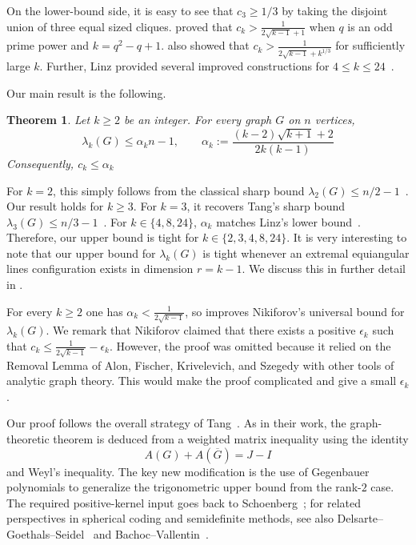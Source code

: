 \documentclass[12pt]{amsart}
\newtheorem{theorem}{Theorem}[section]
\theoremstyle{myremark}
\newcommand{\1}{\mathbf{1}}
\begin{document}
On the lower-bound side, it is easy to see that $c_3 \geq 1/3$ by taking the disjoint union of three equal sized cliques. \cite{Nikiforov15} proved that $c_k > \frac{1}{2\sqrt{k-1}+1}$ when $q$ is an odd prime power and $k = q^2 - q + 1$. \cite{Nikiforov15} also showed that $c_k > \frac{1}{2\sqrt{k-1}+k^{1/3}}$ for sufficiently large $k$. Further, Linz provided several improved constructions for $4 \leq k \leq 24$~\cite{Linz23}. 


Our main result is the following.

\begin{theorem}\label{thm:main-general}
Let $k\ge 2$ be an integer. For every graph $G$ on $n$ vertices,
\[
\lambda_k(G)\le \alpha_k n-1,
\qquad
\alpha_k:= \frac{(k-2)\sqrt{k+1}+2}{2k(k-1)}
\]
Consequently, $c_k \leq \alpha_k$
\end{theorem}

For $k=2$, this simply follows from the classical sharp bound $\lambda_2(G)\le n/2-1$~\cite{Hong88,Nikiforov15}. Our result holds for $k \geq 3$. For $k=3$, it recovers Tang's sharp bound $\lambda_3(G)\le n/3-1$~\cite{Tang26}. For $k \in \{4,8,24\}$, $\alpha_k$ matches Linz's lower bound~\cite{Linz23}. Therefore, our upper bound is tight for $k \in \{2,3,4,8,24\}$. It is very interesting to note that our upper bound for $\lambda_k(G)$ is tight whenever an extremal equiangular lines configuration exists in dimension $r=k-1$. We discuss this in further detail in .



For every $k\ge 2$ one has
$\alpha_k<\frac{1}{2\sqrt{k-1}}$, so  improves Nikiforov's universal bound for $\lambda_k(G)$. We remark that Nikiforov claimed that there exists a positive $\epsilon_k$ such that $c_k \leq \frac{1}{2\sqrt{k-1}}-\epsilon_k$. However, the proof was omitted because it relied on the Removal Lemma of Alon,
Fischer, Krivelevich, and Szegedy \cite{alon2000efficient} with other tools of analytic graph theory. This would make the proof complicated and give a small $\epsilon_k$.

Our proof follows the overall strategy of Tang~\cite{Tang26}. As in their work, the graph-theoretic theorem is deduced from a weighted matrix inequality using the identity
\[
A(G)+A(\overline G)=J-I
\]
and Weyl's inequality. The key new modification is the use of Gegenbauer polynomials to generalize the trigonometric upper bound from the rank-$2$ case. The required positive-kernel input goes back to Schoenberg~\cite{Schoenberg42}; for related perspectives in spherical coding and semidefinite methods, see also Delsarte--Goethals--Seidel~\cite{DGS77} and Bachoc--Vallentin~\cite{BachocVallentin08}.
\end{document}
